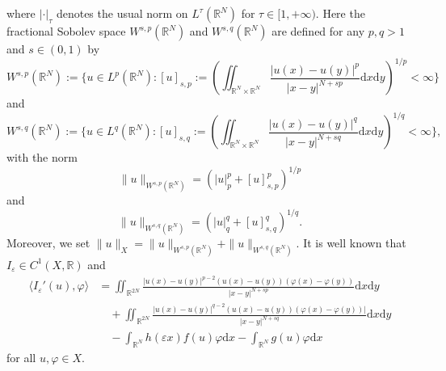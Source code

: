 \documentclass[reqno]{amsart}
\begin{document}
where $|\cdot|_\tau$ denotes the usual norm on $L^{\tau}(\mathbb {R}^N)$ for
$\tau \in [1,+\infty)$.
Here the fractional Sobolev space
$W^{s,p}(\mathbb {R}^N)$ and $W^{s,q}(\mathbb {R}^N)$ are defined for any $p,q > 1$
and $s \in (0, 1)$ by
$$
W^{s,p}(\mathbb {R}^N):=\{u\in L^{p}(\mathbb {R}^N):[u]_{s,p}:=(\iint_{\mathbb{R}^{N}
\times\mathbb{R}^{N}}\frac{|u(x)-u(y)|^p}{|x-y|^{N+sp}}\mathrm{d}x\mathrm{d}y)^{1/p}<\infty\}$$
and
$$
W^{s,q}(\mathbb {R}^N):=\{u\in L^{q}(\mathbb {R}^N):[u]_{s,q}
:=(\iint_{\mathbb{R}^{N}\times\mathbb{R}^{N}}\frac{|u(x)-u(y)|^q}{|x-y|^{N+sq}}\mathrm{d}x\mathrm{d}y)^{1/q}<\infty\},
$$
with the norm
$$
\|u\|_{W^{s,p}(\mathbb {R}^N)}=(|u|_{p}^p+[u]_{s,p}^{p})^{1/p}
$$
and
$$
\|u\|_{W^{s,q}(\mathbb {R}^N)}=(|u|_{q}^q+[u]_{s,q}^{q})^{1/q}.
$$
Moreover, we set $\|u\|_X=\|u\|_{W^{s,p}(\mathbb {R}^N)}+\|u\|_{W^{s,q}(\mathbb {R}^N)}$.
It is well known that $I_{\varepsilon} \in C^{1}(X,\mathbb {R})$ and
\begin{align*}
\langle I_{\varepsilon}' (u),\varphi \rangle
&= \iint_{\mathbb{R}^{2N}}\frac{|u(x)-u(y)|^{p-2}(u(x)-u(y))(\varphi(x)-\varphi(y))}{|x-y|^{N+sp}}\mathrm{d}x\mathrm{d}y\\
&\quad +\iint_{\mathbb{R}^{2N}}\frac{|u(x)-u(y)|^{q-2}(u(x)-u(y))(\varphi(x)-\varphi(y))|}{|x-y|^{N+sq}}\mathrm{d}x\mathrm{d}y\\
&\quad -\int_{ \mathbb{R}^{N}}h(\varepsilon x)f(u)\varphi \mathrm{d}x-\int_{ \mathbb{R}^{N}}g(u)\varphi\mathrm{d}x
\end{align*}
for all $u,\varphi\in X$.
\end{document}
